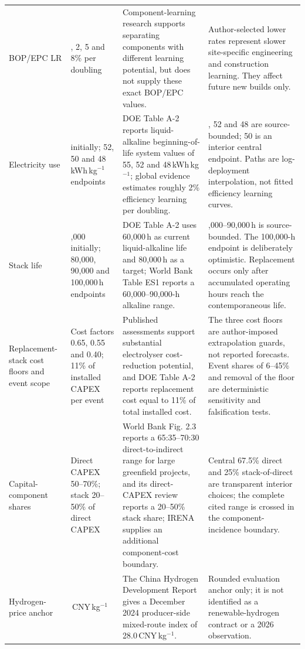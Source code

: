 \documentclass[11pt,a4paper]{article}
\begin{document}
\begin{longtable}{>{\raggedright\arraybackslash}p{}>{\raggedright\arraybackslash}p{}>{\raggedright\arraybackslash}p{}>{\raggedright\arraybackslash}p{}}
BOP/EPC LR & 0, 2, 5 and 8\% per doubling & Component-learning research supports separating components with different learning potential, but does not supply these exact BOP/EPC values\cite{ferioli2009}. & Author-selected lower rates represent slower site-specific engineering and construction learning. They affect future new builds only. \\
Electricity use & 55 initially; 52, 50 and 48\,kWh\,kg$^{-1}$ endpoints & DOE Table A-2 reports liquid-alkaline beginning-of-life system values of 55, 52 and 48\,kWh\,kg$^{-1}$; global evidence estimates roughly 2\% efficiency learning per doubling\cite{doe2024,glenk2023}. & 55, 52 and 48 are source-bounded; 50 is an interior central endpoint. Paths are log-deployment interpolation, not fitted efficiency learning curves. \\
Stack life & 60,000 initially; 80,000, 90,000 and 100,000\,h endpoints & DOE Table A-2 uses 60,000\,h as current liquid-alkaline life and 80,000\,h as a target; World Bank Table ES1 reports a 60,000--90,000-h alkaline range\cite{doe2024,worldbank2026}. & 60,000--90,000\,h is source-bounded. The 100,000-h endpoint is deliberately optimistic. Replacement occurs only after accumulated operating hours reach the contemporaneous life. \\
Replacement-stack cost floors and event scope & Cost factors 0.65, 0.55 and 0.40; 11\% of installed CAPEX per event & Published assessments support substantial electrolyser cost-reduction potential, and DOE Table A-2 reports replacement cost equal to 11\% of total installed cost\cite{irena2020,doe2024}. & The three cost floors are author-imposed extrapolation guards, not reported forecasts. Event shares of 6--45\% and removal of the floor are deterministic sensitivity and falsification tests. \\
Capital-component shares & Direct CAPEX 50--70\%; stack 20--50\% of direct CAPEX & World Bank Fig. 2.3 reports a 65:35--70:30 direct-to-indirect range for large greenfield projects, and its direct-CAPEX review reports a 20--50\% stack share; IRENA supplies an additional component-cost boundary\cite{worldbank2026,irena2020}. & Central 67.5\% direct and 25\% stack-of-direct are transparent interior choices; the complete cited range is crossed in the component-incidence boundary. \\
Hydrogen-price anchor & 28\,CNY\,kg$^{-1}$ & The China Hydrogen Development Report gives a December 2024 producer-side mixed-route index of 28.0\,CNY\,kg$^{-1}$\cite{nea2025hydrogen}. & Rounded evaluation anchor only; it is not identified as a renewable-hydrogen contract or a 2026 observation. \\

\end{longtable}
\end{document}
